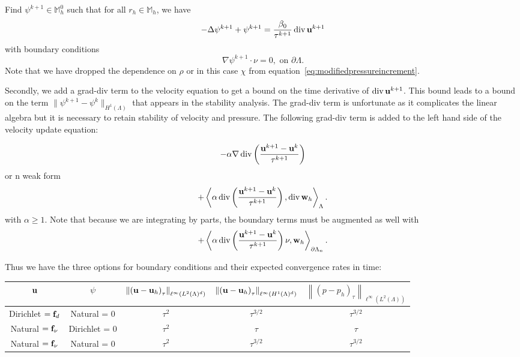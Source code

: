 \documentclass[letterpaper]{erdc}
\begin{document}
Find $\psi^{k+1}\in \mathbb{M}_h^0$ such that for all $r_h\in \mathbb{M}_h$, we have
\begin{equation}\label{eq:modifiedpressureincrement}
  -\Delta\psi^{k+1} + \psi^{k+1} = \frac{\beta_0}{\tau^{k+1}}\operatorname{div}\textbf{u}^{k+1}
\end{equation}
with boundary conditions
\begin{equation}
  \nabla\psi^{k+1} \cdot \nu = 0, \mbox{ on } \partial\Lambda.
\end{equation}
Note that we have dropped the dependence on $\rho$ or in this case $\chi$ from equation~\ref{eq:modifiedpressureincrement}.



Secondly, we add a grad-div term to the velocity equation to get a bound on 
the time derivative of $\operatorname{div}\textbf{u}^{k+1}$.  This bound leads to a bound on the 
term $\|\psi^{k+1}-\psi^{k}\|_{H^1(\Lambda)}$ that appears in the stability analysis.  
The grad-div term is unfortunate as it complicates the linear algebra
but it is necessary to retain stability of velocity and pressure.  The following grad-div term is
added to the left hand side of the velocity update equation:

\begin{equation}
  -\alpha \nabla \operatorname{div}\left(\frac{\textbf{u}^{k+1} - \textbf{u}^{k}}{\tau^{k+1}}  \right)
\end{equation}
or n weak form
\begin{equation}
  + \left\langle \alpha \operatorname{div}\left(\frac{\textbf{u}^{k+1} - \textbf{u}^{k}}{\tau^{k+1}}  \right), \operatorname{div} \textbf{w}_h \right\rangle_{\Lambda}.
\end{equation}
with $\alpha\geq 1$. Note that because we are integrating by parts, the boundary terms must be augmented as well with
\begin{equation}
 + \left\langle \alpha \operatorname{div} \left(\frac{\textbf{u}^{k+1}-\textbf{u}^{k}}{\tau^{k+1}} \right)\nu , \textbf{w}_h \right\rangle_{\partial\Lambda_n}.
\end{equation}


Thus we have the three options for boundary conditions and their expected convergence rates in time:

{\footnotesize
\noindent\begin{tabular}{|c|c|c|c|c|}
	\hline
	$\textbf{u}$ & $\psi$ & $\left\|\left(\textbf{u}-\textbf{u}_h\right)_{\tau}\right\|_{\ell^{\infty}(L^2(\Lambda)^d)}$ & $\left\|\left(\textbf{u}-\textbf{u}_h\right)_{\tau}\right\|_{\ell^{\infty}(H^1(\Lambda)^d)}$ & $\left\|\left(p-p_h\right)_{\tau}\right\|_{\ell^{\infty}(L^2(\Lambda))}$  \\
	\hline
	Dirichlet $=\mathbf{f}_d$ & Natural = 0 & $\tau^{2}$ & $\tau^{3/2}$ & $\tau^{3/2}$ \\
	\hline
	Natural $=\mathbf{f}_\nu$ & Dirichlet = 0 & $\tau^{2}$ & $\tau$ & $\tau$\\
	\hline
	Natural $=\mathbf{f}_{\nu}$ & Natural = 0 & $\tau^{2}$ & $\tau^{3/2}$ & $\tau^{3/2}$ \\
	\hline
\end{tabular}
}
\end{document}
